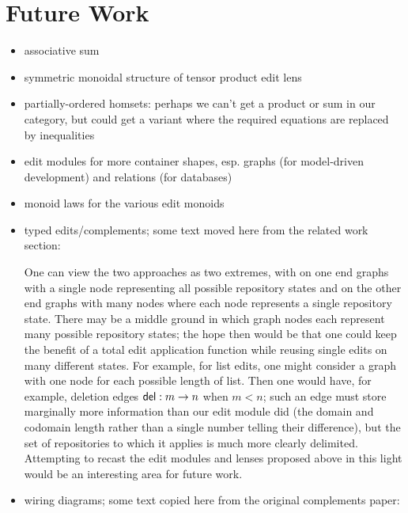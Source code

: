 \section{Future Work}
\label{sec:future}

\begin{itemize}
    \item associative sum
    \item symmetric monoidal structure of tensor product edit lens
    \item partially-ordered homsets: perhaps we can't get a product or sum
        in our category, but could get a variant where the required
        equations are replaced by inequalities
    \item edit modules for more container shapes, esp. graphs (for
        model-driven development) and relations (for databases)
    \item monoid laws for the various edit monoids
    \item typed edits/complements; some text moved here from the related
        work section:

        One can view the two approaches as two extremes, with on one end
        graphs with a single node representing all possible repository
        states and on the other end graphs with many nodes where each node
        represents a single repository state. There may be a middle ground
        in which graph nodes each represent many possible repository states;
        the hope then would be that one could keep the benefit of a total
        edit application function while reusing single edits on many
        different states. For example, for list edits, one might consider a
        graph with one node for each possible length of list. Then one would
        have, for example, deletion edges $\mathsf{del} : m \to n$ when
        $m<n$; such an edge must store marginally more information than our
        edit module did (the domain and codomain length rather than a single
        number telling their difference), but the set of repositories to
        which it applies is much more clearly delimited. Attempting to
        recast the edit modules and lenses proposed above in this light
        would be an interesting area for future work.
    \item wiring diagrams; some text copied here from the original
        complements paper:


\end{itemize}
